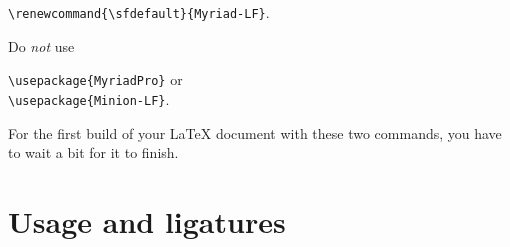 \begin{enumerate}
\begin{center}
\begin{minipage}[t]{8cm}
	\begin{flushleft}
	\verb+\renewcommand{\sfdefault}{Myriad-LF}+.
	\end{flushleft}
	\end{minipage}\end{center}Do \emph{not} use 
	\begin{center}\begin{minipage}[t]{8cm}
	\begin{flushleft}
	\verb+\usepackage{MyriadPro}+ or\\
	\verb+\usepackage{Minion-LF}+.
	\end{flushleft}
	\end{minipage}\end{center}
	For the first build of your \LaTeX{} document with these two commands, you have to wait a bit for it to finish.
\end{enumerate}

\section{Usage and ligatures}

